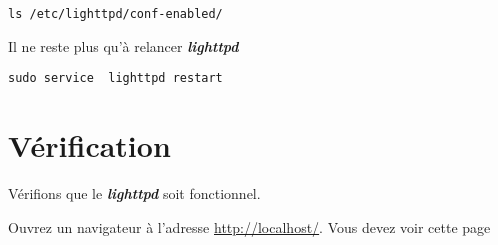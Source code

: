\documentclass[a4paper,10pt,usenames]{article}
\begin{document}
\begin{lstlisting}
ls /etc/lighttpd/conf-enabled/
\end{lstlisting}

Il ne reste plus qu'à relancer \textit{\textbf{lighttpd}}

\begin{lstlisting}
sudo service  lighttpd restart
\end{lstlisting}

\section{Vérification}


\begin{list}{}{}
\item Vérifions que le \textit{\textbf{lighttpd}} soit fonctionnel.

Ouvrez un navigateur à l'adresse \url{http://localhost/}.  Vous devez voir cette page 



\end{list}
\end{document}
